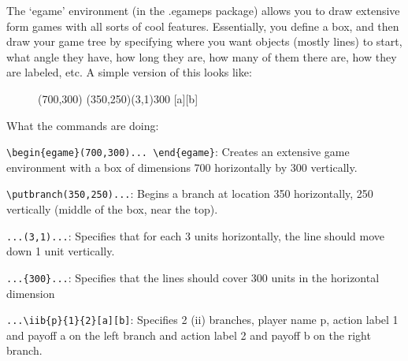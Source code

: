 \documentclass{article}
\begin{document}
The `egame' environment (in the .egameps package) allows you to draw extensive form games with all sorts of cool features.  Essentially, you define a box, and then draw your game tree by specifying where you want objects (mostly lines) to start, what angle they have, how long they are, how many of them there are, how they are labeled, etc.  A simple version of this looks like: \\



\begin{figure}[h]
\begin{footnotesize}
\begin{center}
\begin{egame}(700,300)
\putbranch(350,250)(3,1){300} [a][b]
\end{egame}
\end{center}
\end{footnotesize}
\end{figure}


What the commands are doing: \\

\begin{compactitem}
\item \verb+\begin{egame}(700,300)... \end{egame}+: Creates an extensive game environment with a box of dimensions 700 horizontally by 300 vertically.
\item \verb+\putbranch(350,250)...+: Begins a branch at location 350 horizontally, 250 vertically (middle of the box, near the top).
\item \verb+...(3,1)...+: Specifies that for each 3 units horizontally, the line should move down 1 unit vertically.
\item \verb+...{300}...+: Specifies that the lines should cover 300 units in the horizontal dimension
\item \verb+...\iib{p}{1}{2}[a][b]+: Specifies 2 (ii) branches, player name p, action label 1 and payoff a on the left branch and action label 2 and payoff b on the right branch. \\
\end{compactitem}
\end{document}
